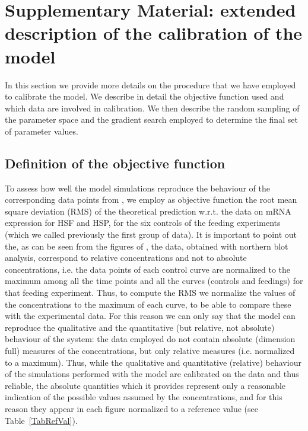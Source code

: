 \documentclass[oneside, 10pt, a4paper, twocolumn]{article}
\begin{document}
\section{Supplementary Material: extended description of the calibration of the model}
\label{SecCalibrationExtended}

In this section we provide more details on the procedure that we have employed to calibrate the model. We describe in detail the objective function used and which data are involved in calibration. We then describe the random sampling of the parameter space and the gradient search employed to determine the final set of parameter values.

\subsection*{Definition of the objective function}

To assess how well the model simulations reproduce the behaviour of the corresponding data points from \cite{Schmollinger2013}, we employ as objective function the root mean square deviation (RMS) of the theoretical prediction w.r.t. the data on mRNA expression for HSF and HSP, for the six controls of the feeding experiments (which we called previously the first group of data). 
It is important to point out the, as can be seen from the figures of \cite{Schmollinger2013}, the data, obtained with northern blot analysis, correspond to relative concentrations and not to absolute concentrations, i.e. the data points of each control curve are normalized to the maximum among all the time points and all the curves (controls and feedings) for that feeding experiment. Thus, to compute the RMS we normalize the values of the concentrations to the maximum of each curve, to be able to compare these with the experimental data. For this reason we can only say that the model can reproduce the qualitative and the quantitative (but relative, not absolute) behaviour of the system: the data employed do not contain absolute (dimension full) measures of the concentrations, but only relative measures (i.e. normalized to a maximum). Thus, while the qualitative and quantitative (relative) behaviour of the simulations performed with the model are calibrated on the data and thus reliable, the absolute quantities which it provides represent only a reasonable indication of the possible values assumed by the concentrations, and for this reason they appear in each figure normalized to a reference value (see Table~\ref{TabRefVal}).
\end{document}
